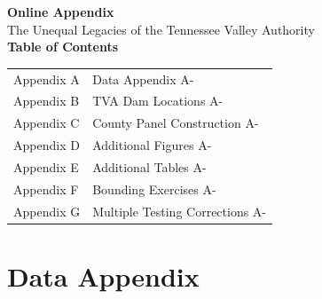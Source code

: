 \documentclass[12pt]{article}
\begin{document}
\clearpage
{}
\clearpage
{}
\clearpage
{}
\clearpage
{}
\clearpage
{}
\clearpage
{}


\clearpage
\appendix
\setcounter{page}{1}
\renewcommand{\thepage}{A-\arabic{page}}
\setcounter{table}{0}
\renewcommand{\thetable}{A\arabic{table}}
\setcounter{figure}{0}
\renewcommand{\thefigure}{A\arabic{figure}}

\begin{center}
{\Large \textbf{Online Appendix}}\\[1em]
{\large The Unequal Legacies of the Tennessee Valley Authority}\\[2em]

\textbf{Table of Contents}\\[1em]
\begin{tabular}{ll}
Appendix A & Data Appendix \dotfill A-\pageref{app:data} \\
Appendix B & TVA Dam Locations \dotfill A-\pageref{app:dams} \\
Appendix C & County Panel Construction \dotfill A-\pageref{app:linkage} \\
Appendix D & Additional Figures \dotfill A-\pageref{app:figures} \\
Appendix E & Additional Tables \dotfill A-\pageref{app:tables} \\
Appendix F & Bounding Exercises \dotfill A-\pageref{app:bounds} \\
Appendix G & Multiple Testing Corrections \dotfill A-\pageref{app:testing} \\
\end{tabular}
\end{center}


\section{Data Appendix}\label{app:data}
\end{document}
